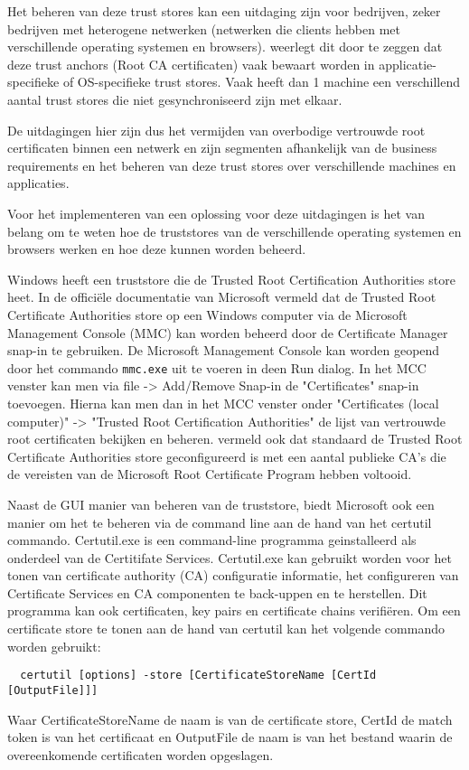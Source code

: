 Het beheren van deze trust stores kan een uitdaging zijn voor bedrijven, zeker bedrijven met heterogene netwerken (netwerken die clients hebben met verschillende operating systemen en browsers).
\textcite{rfc6024} weerlegt dit door te zeggen dat deze trust anchors (Root CA certificaten) vaak bewaart worden in applicatie-specifieke of OS-specifieke trust stores.
Vaak heeft dan 1 machine een verschillend aantal trust stores die niet gesynchroniseerd zijn met elkaar. \break

De uitdagingen hier zijn dus het vermijden van overbodige vertrouwde root certificaten binnen een netwerk en zijn segmenten afhankelijk van de business requirements en het beheren van deze trust stores over verschillende machines en applicaties. 

Voor het implementeren van een oplossing voor deze uitdagingen is het van belang om te weten hoe de truststores van de verschillende operating systemen en browsers werken en hoe deze kunnen worden beheerd. \break

Windows heeft een truststore die de Trusted Root Certification Authorities store heet.
In de officiële documentatie van Microsoft vermeld \textcite{MStruststore} dat de Trusted Root Certificate Authorities store op een Windows computer via de Microsoft Management Console (MMC) kan worden beheerd door de Certificate Manager snap-in te gebruiken.
De Microsoft Management Console kan worden geopend door het commando \texttt{mmc.exe} uit te voeren in deen Run dialog. In het MCC venster kan men via file -> Add/Remove Snap-in de "Certificates" snap-in toevoegen.
Hierna kan men dan in het MCC venster onder "Certificates (local computer)" -> "Trusted Root Certification Authorities" de lijst van vertrouwde root certificaten bekijken en beheren.
\textcite{MStruststore} vermeld ook dat standaard de Trusted Root Certificate Authorities store geconfigureerd is met een aantal publieke CA's die de vereisten van de Microsoft Root Certificate Program hebben voltooid. \break

Naast de GUI manier van beheren van de truststore, biedt Microsoft ook een manier om het te beheren via de command line aan de hand van het certutil commando.
Certutil.exe is een command-line programma geinstalleerd als onderdeel van de Certitifate Services. Certutil.exe kan gebruikt worden voor het tonen van certificate authority (CA) configuratie informatie, het configureren van Certificate Services en CA componenten te back-uppen en te herstellen.
Dit programma kan ook certificaten, key pairs en certificate chains verifiëren. \autocite{MScertutil}
Om een certificate store te tonen aan de hand van certutil kan het volgende commando worden gebruikt:
\begin{verbatim}
  certutil [options] -store [CertificateStoreName [CertId [OutputFile]]]
\end{verbatim}
Waar CertificateStoreName de naam is van de certificate store, CertId de match token is van het certificaat en OutputFile de naam is van het bestand waarin de overeenkomende certificaten worden opgeslagen. \autocite{MScertutil}

